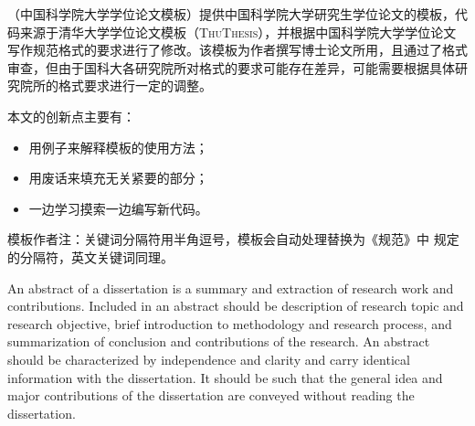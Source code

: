 \begin{cabstract}


\ucasthesis{}（中国科学院大学学位论文模板）提供中国科学院大学研究生学位论文的模板，代码来源于清华大学学位论文模板（\textsc{ThuThesis}），并根据中国科学院大学学位论文写作规范格式的要求进行了修改。该模板为作者撰写博士论文所用，且通过了格式审查，但由于国科大各研究院所对格式的要求可能存在差异，可能需要根据具体研究院所的格式要求进行一定的调整。

本文的创新点主要有：

  \begin{itemize}
    \item 用例子来解释模板的使用方法；
    \item 用废话来填充无关紧要的部分；
    \item 一边学习摸索一边编写新代码。
  \end{itemize}

\textsf{模板作者注}：关键词分隔符用半角逗号，模板会自动处理替换为《规范》中
规定的分隔符，英文关键词同理。

\end{cabstract}


\begin{eabstract} 

An abstract of a dissertation is a summary and extraction of research work and
contributions. Included in an abstract should be description of research topic
and research objective, brief introduction to methodology and research
process, and summarization of conclusion and contributions of the research. An
abstract should be characterized by independence and clarity and carry
identical information with the dissertation. It should be such that the
general idea and major contributions of the dissertation are conveyed without
reading the dissertation. 

\end{eabstract}

